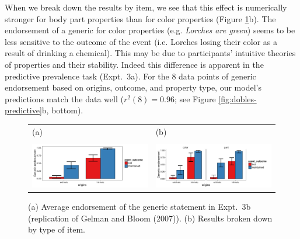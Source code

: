 \documentclass[12pt,letterpaper]{article}
\begin{document}


 
When we break down the results by item, we see that this effect is numerically stronger for body part properties than for color properties (Figure \ref{fig:dobles-results}b).
The endorsement of a generic for color properties (e.g. \emph{Lorches are green}) seems to be less sensitive to the outcome of the event (i.e. Lorches losing their color as a result of drinking a chemical).
This may be due to participants' intuitive theories of properties and their stability. 
Indeed this difference is apparent in the predictive prevalence task (Expt.~3a).
For the 8 data points of generic endorsement based on origins, outcome, and property type, our model's predictions match the data well ($r^2(8) = 0.96$; see Figure \ref{fig:dobles-predictive}b, bottom).


\begin{figure}
\begin{tabular}{l l}
(a) & (b) \\
\\
\centering
    \includegraphics[width=0.5\columnwidth]{dobles-results.pdf} &
    \includegraphics[width=0.5\columnwidth]{dobles-byItem-results.pdf} \\
\end{tabular}
    \caption{
    (a) Average endorsement of the generic statement in Expt.~3b (replication of Gelman and Bloom (2007)). (b)  Results broken down by type of item.
  }
  \label{fig:dobles-results}
\end{figure}
\end{document}
